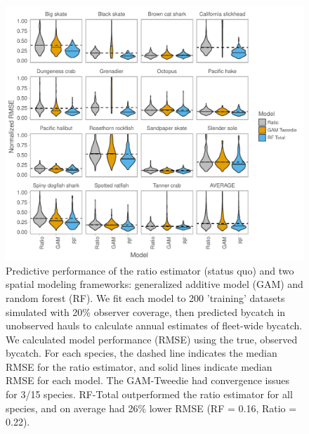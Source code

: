 \documentclass[]{article}
\begin{document}
\begin{figure}

{\centering \includegraphics{bycatch_sim_paper_sepsupp_files/figure-latex/model-comparison-1} 

}

\caption{Predictive performance of the ratio estimator (status quo) and two spatial modeling frameworks: generalized additive model (GAM) and random forest (RF). We fit each model to 200 'training' datasets simulated with 20\% observer coverage, then predicted bycatch in unobserved hauls to calculate annual estimates of fleet-wide bycatch. We calculated model performance (RMSE) using the true, observed bycatch. For each species, the dashed line indicates the median RMSE for the ratio estimator, and solid lines indicate median RMSE for each model. The GAM-Tweedie had convergence issues for 3/15 species. RF-Total outperformed the ratio estimator for all species, and on average had 26\% lower RMSE (RF = 0.16, Ratio = 0.22).}\label{fig:model-comparison}
\end{figure}

\pagebreak
\end{document}
